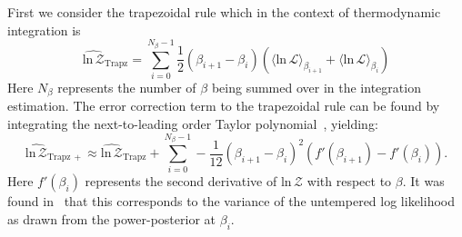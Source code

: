 First we consider the trapezoidal rule which in the context of thermodynamic integration is
\begin{equation}
    \widehat{\mathrm{ln} \, \mathcal{Z}}_{\mathrm{Trapz}} = \sum_{i=0}^{N_\beta-1} \frac{1}{2} \left(\beta_{i+1} - \beta_i \right) \left(\langle \mathrm{ln} \, \mathcal{L} \rangle_{\beta_{i+1}} + \langle \mathrm{ln} \, \mathcal{L} \rangle_{\beta_{i}} \right)
\end{equation}
Here $N_\beta$ represents the number of $\beta$ being summed over in the integration estimation. The error correction term to the trapezoidal rule can be found by integrating the next-to-leading order Taylor polynomial~\citep{abramowitz1965handbook}, yielding:
\begin{equation}
    \widehat{\mathrm{ln} \, \mathcal{Z}}_{\mathrm{Trapz \, +}} \approx \widehat{\mathrm{ln} \, \mathcal{Z}}_{\mathrm{Trapz}} + \sum_{i=0}^{N_\beta-1} -\frac{1}{12} \left(\beta_{i+1} - \beta_i \right)^2 \left(f'(\beta_{i+1}) - f'(\beta_{i}) \right).
\end{equation}
Here $f'(\beta_i)$ represents the second derivative of $\mathrm{ln} \, \mathcal{Z}$ with respect to $\beta$. It was found in~\cite{friel2014improving} that this corresponds to the variance of the untempered log likelihood as drawn from the power-posterior at $\beta_i$.

